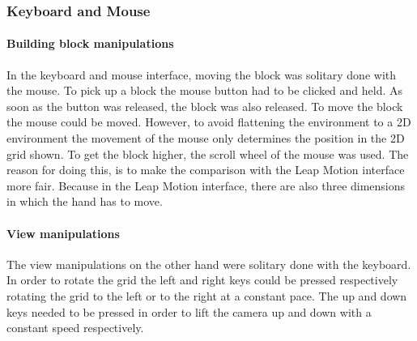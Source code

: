 \subsubsection{Keyboard and Mouse}

\paragraph{Building block manipulations}
In the keyboard and mouse interface, moving the block was solitary done with the mouse. To pick up a block the mouse button had to be clicked and held. As soon as the 
button was released, the block was also released. To move the block the mouse could be moved. However, to avoid flattening the environment to a 2D environment the movement 
of the mouse only determines the position in the 2D grid shown. To get the block higher, the scroll wheel of the mouse was used. The reason for doing this, is to make the 
comparison with the Leap Motion interface more fair. Because in the Leap Motion interface, there are also three dimensions in which the hand has to move.


\paragraph{View manipulations}
The view manipulations on the other hand were solitary done with the keyboard. In order to rotate the grid the left and right keys could be pressed respectively rotating the
 grid to the left or to the right at a constant pace. The up and down keys needed to be pressed in order to lift the camera up and down with a constant speed respectively.  